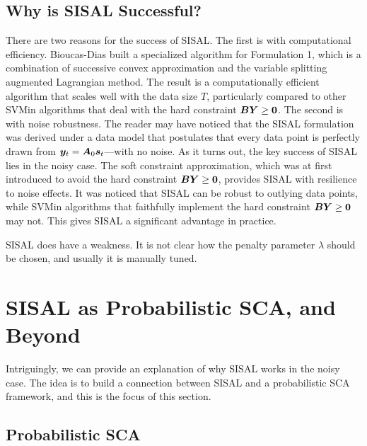 \documentclass[10pt,twocolumn,twoside]{IEEEtran}
\begin{document}
\subsection{Why is SISAL Successful?}

There are two reasons for the success of SISAL.
The first is with computational efficiency.
Bioucas-Dias built a specialized algorithm for Formulation 1, which is a combination of successive convex approximation and the variable splitting augmented Lagrangian method.
The result is a computationally efficient algorithm that scales well with the data size $T$, particularly compared to other SVMin algorithms that deal with the hard constraint ${\bm B} {\bm Y} \geq {\bm 0}$.
The second is with noise robustness.
The reader may have noticed that the SISAL formulation was derived under a data model that postulates that every data point is perfectly drawn from ${\bm y}_t = {\bm A}_0 {\bm s}_t$---with no noise.
As it turns out, the key success of SISAL lies in the noisy case.
The soft constraint approximation, which was at first introduced to avoid the hard constraint ${\bm B} {\bm Y} \geq {\bm 0}$, provides SISAL with resilience to noise effects.
It was noticed that SISAL can be robust to outlying data points, while SVMin algorithms that faithfully implement the hard constraint ${\bm B} {\bm Y} \geq {\bm 0}$ may not.
This gives SISAL a significant advantage in practice.

SISAL does have a weakness.
It is not clear how the penalty parameter $\lambda$ should be chosen, and usually it is manually tuned.



\section{SISAL as Probabilistic SCA, and Beyond}
\label{sect:prism}

Intriguingly, we can provide an explanation of why SISAL works in the noisy case.
The idea is to build a connection between SISAL and a probabilistic SCA framework,
and this is the focus of this section.


\subsection{Probabilistic SCA}
\end{document}
